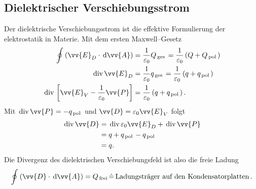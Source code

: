\subsection{Dielektrischer Verschiebungsstrom}
Der dielektrische Verschiebungsstrom ist die effektive Formulierung der elektrostatik in Materie. Mit dem ersten Maxwell--Gesetz
\begin{align*}
        \oint_{}^{}\left(\vv{E}_D\cdot \td \vv{A}\right)&=\dfrac{1}{\varepsilon _0}Q_{\,\text{ges}\,}=\dfrac{1}{\varepsilon _0}\left(Q+Q_{\,\text{pol}\,}\right)\\
        \,\text{div}\,\vv{E}_D&=\dfrac{1}{\varepsilon _0}q_{\,\text{ges}\,}=\dfrac{1}{\varepsilon _0}\left(q+q_{\,\text{pol}\,}\right)\\
        \,\text{div}\,\left[\vv{E}_V-\dfrac{1}{\varepsilon _0}\vv{P}\right]&=\dfrac{1}{\varepsilon _0}\left(q+q_{\,\text{pol}\,}\right)
.\end{align*}
Mit $\,\text{div}\,\vv{P}=-q_{\,\text{pol}\,}$ und $\vv{D}=\varepsilon _0\vv{E}_V$ folgt
\begin{align*}
        \,\text{div}\,\vv{D}&=\,\text{div}\,\varepsilon _0\vv{E}_D+\,\text{div}\,\vv{P}\\
                            &=q+q_{\,\text{pol}\,}-q_{\,\text{pol}\,}\\
                            &=q
.\end{align*}
Die Divergenz des dielektrischen Verschiebungsfeld ist also die freie Ladung
\[ 
        \oint_{}^{}\left(\vv{D}\cdot \td \vv{A}\right)=Q_{\,\text{frei}\,}\hat{=}\,\text{Ladungsträger auf den Kondensatorplatten}\,
.\] 

